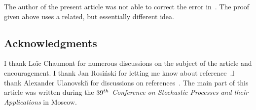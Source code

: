 \documentclass[11pt]{article}
\theoremstyle{definition}
\numberwithin{equation}{section}
\numberwithin{figure}{section}
\numberwithin{table}{section}
\begin{document}
The author of the present article was not able to correct the error in~\cite{bib:u94}. The proof given above uses a related, but essentially different idea.



\subsection*{Acknowledgments}
I thank Lo\"ic Chaumont for numerous discussions on the subject of the article and encouragement. I thank Jan Rosiński for letting me know about reference~\cite{bib:ou90}.\linebreak I thank Alexander Ulanovski\u{\i} for discussions on references~\cite{bib:ou90,bib:u94}. The main part of this article was written during the \emph{$39^{\rm th}$ Conference on Stochastic Processes and their Applications} in Moscow.
\end{document}
